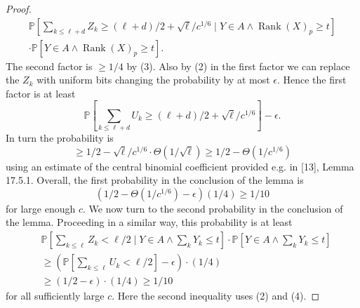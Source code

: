 \documentclass[10pt,a4paper]{article}
\begin{document}
\begin{proof}
\begin{multline*}
\mathbb P\left[\sum_{k\leq\ell+d}Z_k\geq(\ell+d)/2+\sqrt\ell/c^{1/6}\mid Y\in A\wedge\operatorname{Rank}(X)_p\geq t\right]\\
\cdot\mathbb P[Y\in A\wedge\operatorname{Rank}(X)_p\geq t].
\end{multline*}
The second factor is $\geq1/4$ by (3). Also by (2) in the first factor we can replace the $Z_k$ with uniform bits changing the probability by at most $\epsilon$. Hence the first factor is at least
\[\mathbb P\left[\sum_{k\leq\ell+d}U_k\geq(\ell+d)/2+\sqrt\ell/c^{1/6}\right]-\epsilon.\]
In turn the probability is
\[\geq1/2-\sqrt\ell/c^{1/6}\cdot\Theta(1/\sqrt\ell)\geq1/2-\Theta(1/c^{1/6})\]
using an estimate of the central binomial coefficient provided e.g. in [13], Lemma 17.5.1.
Overall, the first probability in the conclusion of the lemma is
\[(1/2-\Theta(1/c^{1/6})-\epsilon)(1/4)\geq1/10\]
for large enough $c$.
We now turn to the second probability in the conclusion of the lemma. Proceeding in a similar way, this probability is at least
\begin{align*}
&\mathbb P\left[\sum_{k\leq\ell}Z_k<\ell/2\mid Y\in A\wedge\sum_kY_k\leq t\right]\cdot\mathbb P\left[Y\in A\wedge\sum_kY_k\leq t\right]\\
&\geq\left(\mathbb P\left[\sum_{k\leq\ell}U_k<\ell/2\right]-\epsilon\right)\cdot(1/4)\\
&\geq(1/2-\epsilon)\cdot(1/4)\geq1/10
\end{align*}
for all sufficiently large $c$. Here the second inequality uses (2) and (4).
\end{proof}
\end{document}
